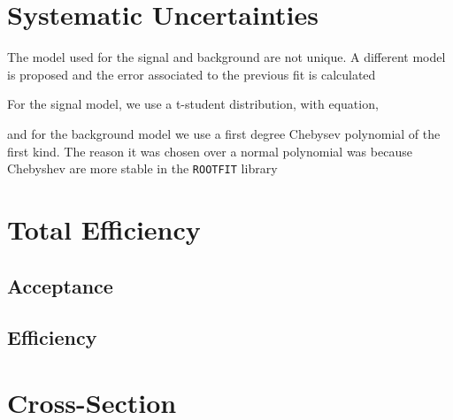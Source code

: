 \section{Systematic Uncertainties}
The model used for the signal and background are not unique. A different model is proposed and the error associated to the previous fit is calculated

For the signal model, we use a t-student distribution, with equation,

and for the background model we use a first degree Chebysev polynomial of the first kind. The reason it was chosen over a normal polynomial was because Chebyshev are more stable in the \verb|ROOTFIT| library 

\section{Total Efficiency}
\subsection{Acceptance}

\subsection{Efficiency}
\section{Cross-Section}
\lipsum[4]